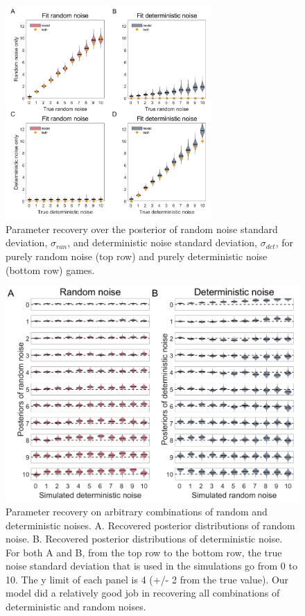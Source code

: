 \documentclass[12pt]{article}
\begin{document}
	\begin{figure}[H]
		\begin{center}
			\includegraphics[width=0.7\textwidth]{figures/RDBayes_parameterrecovery_grid_pureRanDet.jpg}
			\caption{Parameter recovery over the posterior of random noise standard deviation, $\sigma_{ran}$, and deterministic noise standard deviation, $\sigma_{det}$, for purely random noise (top row) and purely deterministic noise (bottom row) games. 
			}
			\label{fig:puredetran}
		\end{center}
	\end{figure} 

	\begin{figure}[hp]
		\begin{center}
			\includegraphics[width=1\textwidth]{figures/RDBayes_parameterrecovery_gridsimu_all.jpg}
			\caption{Parameter recovery on arbitrary combinations of random and deterministic noises. A. Recovered posterior distributions of random noise. B. Recovered posterior distributions of deterministic noise. For both A and B, from the top row to the bottom row, the true noise standard deviation that is used in the simulations go from 0 to 10. The y limit of each panel is 4 (+/- 2 from the true value). Our model did a relatively good job in recovering all combinations of deterministic and random noises.}
			\label{fig:gridall}
		\end{center}
	\end{figure} 
	
\end{document}
